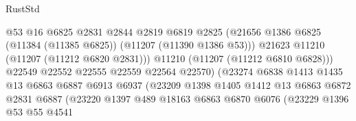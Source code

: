 \begin{lexlean}{RustStd}
\begin{coremodule}
                                          @53
                                          @16
                                          @6825
                                          @2831
                                          @2844
                                          @2819
                                          @6819
                                          @2825
                                          (@21656
                                            @1386
                                            @6825
                                            (@11384 (@11385 @6825))
                                            (@11207 (@11390 @1386 @53)))
                                          @21623
                                          @11210
                                          (@11207 (@11212 @6820 @2831)))
                                        @11210
                                        (@11207 (@11212 @6810 @6828)))
                                      @22549
                                      @22552
                                      @22555
                                      @22559
                                      @22564
                                      @22570)
                                    (@23274
                                      @6838
                                      @1413
                                      @1435
                                      @13
                                      @6863
                                      @6887
                                      @6913
                                      @6937
                                      (@23209
                                        @1398
                                        @1405
                                        @1412
                                        @13
                                        @6863
                                        @6872
                                        @2831
                                        @6887
                                        (@23220
                                          @1397
                                          @489
                                          @18163
                                          @6863
                                          @6870
                                          @6076
                                          (@23229
                                            @1396
                                            @53
                                            @55
                                            @4541

\end{coremodule}
\end{lexlean}
